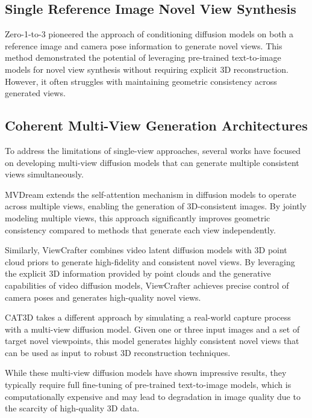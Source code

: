 \subsection{Single Reference Image Novel View Synthesis}

Zero-1-to-3 \cite{zero1to3} pioneered the approach of conditioning
diffusion models on both a reference image and camera pose
information to generate novel views. This method demonstrated the
potential of leveraging pre-trained text-to-image models for novel
view synthesis without requiring explicit 3D reconstruction. However,
it often struggles with maintaining geometric consistency across
generated views.

\subsection{Coherent Multi-View Generation Architectures}

To address the limitations of single-view approaches, several works
have focused on developing multi-view diffusion models that can
generate multiple consistent views simultaneously.

MVDream \cite{mvdream} extends the self-attention mechanism in
diffusion models to operate across multiple views, enabling the
generation of 3D-consistent images. By jointly modeling multiple
views, this approach significantly improves geometric consistency
compared to methods that generate each view independently.

Similarly, ViewCrafter \cite{viewcrafter} combines video latent
diffusion models \cite{videolatentdiffusion} with 3D point cloud
priors to generate high-fidelity and consistent novel views. By
leveraging the explicit 3D information provided by point clouds and
the generative capabilities of video diffusion models, ViewCrafter
achieves precise control of camera poses and generates high-quality novel views.

CAT3D \cite{cat3d} takes a different approach by simulating a
real-world capture process with a multi-view diffusion model. Given
one or three input images and a set of target novel viewpoints, this
model generates highly consistent novel views that can be used as
input to robust 3D reconstruction techniques.

While these multi-view diffusion models have shown impressive
results, they typically require full fine-tuning of pre-trained
text-to-image models, which is computationally expensive and may lead
to degradation in image quality due to the scarcity of high-quality 3D data.

